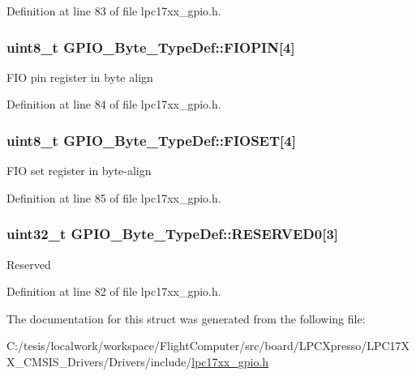 \-Definition at line 83 of file lpc17xx\-\_\-gpio.\-h.

\hypertarget{struct_g_p_i_o___byte___type_def_abed435a35047947234bb484581f694a2}{
\subsubsection[{\-F\-I\-O\-P\-I\-N}]{ uint8\-\_\-t {\bf \-G\-P\-I\-O\-\_\-\-Byte\-\_\-\-Type\-Def\-::\-F\-I\-O\-P\-I\-N}\mbox{[}4\mbox{]}}}\label{struct_g_p_i_o___byte___type_def_abed435a35047947234bb484581f694a2}
\-F\-I\-O pin register in byte align 

\-Definition at line 84 of file lpc17xx\-\_\-gpio.\-h.

\hypertarget{struct_g_p_i_o___byte___type_def_aec9356e948f1a087f9ddb2353f4ccfcc}{
\subsubsection[{\-F\-I\-O\-S\-E\-T}]{ uint8\-\_\-t {\bf \-G\-P\-I\-O\-\_\-\-Byte\-\_\-\-Type\-Def\-::\-F\-I\-O\-S\-E\-T}\mbox{[}4\mbox{]}}}\label{struct_g_p_i_o___byte___type_def_aec9356e948f1a087f9ddb2353f4ccfcc}
\-F\-I\-O set register in byte-\/align 

\-Definition at line 85 of file lpc17xx\-\_\-gpio.\-h.

\hypertarget{struct_g_p_i_o___byte___type_def_aaa66661eb3d06d2b93d55a580d8f43c9}{
\subsubsection[{\-R\-E\-S\-E\-R\-V\-E\-D0}]{\setlength{\rightskip}{0pt plus 5cm}uint32\-\_\-t {\bf \-G\-P\-I\-O\-\_\-\-Byte\-\_\-\-Type\-Def\-::\-R\-E\-S\-E\-R\-V\-E\-D0}\mbox{[}3\mbox{]}}}\label{struct_g_p_i_o___byte___type_def_aaa66661eb3d06d2b93d55a580d8f43c9}
\-Reserved 

\-Definition at line 82 of file lpc17xx\-\_\-gpio.\-h.



\-The documentation for this struct was generated from the following file\-:\begin{DoxyCompactItemize}
\item 
\-C\-:/tesis/localwork/workspace/\-Flight\-Computer/src/board/\-L\-P\-C\-Xpresso/\-L\-P\-C17\-X\-X\-\_\-\-C\-M\-S\-I\-S\-\_\-\-Drivers/\-Drivers/include/\hyperlink{lpc17xx__gpio_8h}{lpc17xx\-\_\-gpio.\-h}\end{DoxyCompactItemize}
